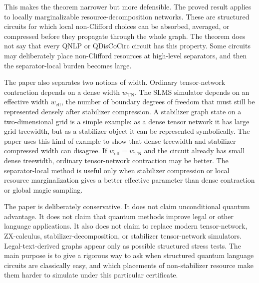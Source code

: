 This makes the theorem narrower but more defensible. The proved result applies to locally marginalizable resource-decomposition networks. These are structured circuits for which local non-Clifford choices can be absorbed, averaged, or compressed before they propagate through the whole graph. The theorem does not say that every QNLP or QDisCoCirc circuit has this property. Some circuits may deliberately place non-Clifford resources at high-level separators, and then the separator-local burden becomes large.

The paper also separates two notions of width. Ordinary tensor-network contraction depends on a dense width \(w_{\mathrm{TN}}\). The SLMS simulator depends on an effective width \(w_{\mathrm{eff}}\), the number of boundary degrees of freedom that must still be represented densely after stabilizer compression. A stabilizer graph state on a two-dimensional grid is a simple example: as a dense tensor network it has large grid treewidth, but as a stabilizer object it can be represented symbolically. The paper uses this kind of example to show that dense treewidth and stabilizer-compressed width can disagree. If \(w_{\mathrm{eff}}=w_{\mathrm{TN}}\) and the circuit already has small dense treewidth, ordinary tensor-network contraction may be better. The separator-local method is useful only when stabilizer compression or local resource marginalization gives a better effective parameter than dense contraction or global magic sampling.

The paper is deliberately conservative. It does not claim unconditional quantum advantage. It does not claim that quantum methods improve legal or other language applications. It also does not claim to replace modern tensor-network, ZX-calculus, stabilizer-decomposition, or stabilizer tensor-network simulators. Legal-text-derived graphs appear only as possible structured stress tests. The main purpose is to give a rigorous way to ask when structured quantum language circuits are classically easy, and which placements of non-stabilizer resource make them harder to simulate under this particular certificate.
